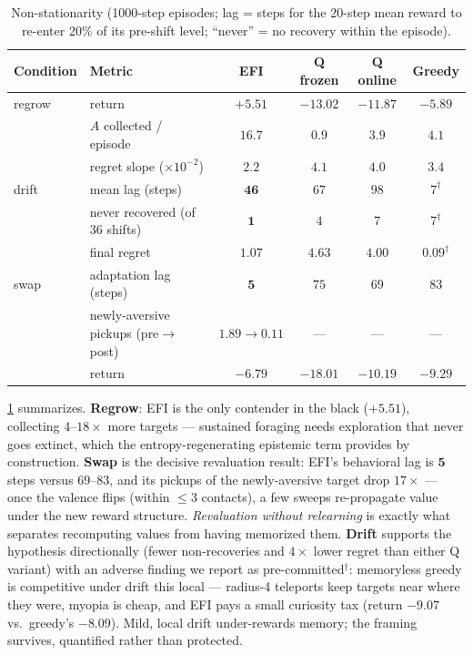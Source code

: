 \documentclass[11pt]{article}
\begin{document}
\begin{table}[t]
\centering
\caption{Non-stationarity (1000-step episodes; lag = steps for the 20-step mean reward to re-enter 20\% of its pre-shift level; ``never'' = no recovery within the episode).}
\label{tab:nonstat}
\small
\begin{tabular}{llcccc}
\toprule
Condition & Metric & \textbf{EFI} & Q frozen & Q online & Greedy \\
\midrule
regrow & return & $\mathbf{+5.51}$ & $-13.02$ & $-11.87$ & $-5.89$ \\
       & $A$ collected / episode & $\mathbf{16.7}$ & $0.9$ & $3.9$ & $4.1$ \\
       & regret slope ($\times10^{-2}$) & $\mathbf{2.2}$ & $4.1$ & $4.0$ & $3.4$ \\
\midrule
drift  & mean lag (steps) & $\mathbf{46}$ & $67$ & $98$ & $7^{\dagger}$ \\
       & never recovered (of 36 shifts) & $\mathbf{1}$ & $4$ & $7$ & $7^{\dagger}$ \\
       & final regret & $1.07$ & $4.63$ & $4.00$ & $\mathbf{0.09}^{\dagger}$ \\
\midrule
swap   & adaptation lag (steps) & $\mathbf{5}$ & $75$ & $69$ & $83$ \\
       & newly-aversive pickups (pre$\to$post) & $\mathbf{1.89\to0.11}$ & --- & --- & --- \\
       & return & $\mathbf{-6.79}$ & $-18.01$ & $-10.19$ & $-9.29$ \\
\bottomrule
\end{tabular}
\end{table}

\cref{tab:nonstat} summarizes. \textbf{Regrow}: EFI is the only contender in the black ($+5.51$), collecting $4$--$18\times$ more targets --- sustained foraging needs exploration that never goes extinct, which the entropy-regenerating epistemic term provides by construction. \textbf{Swap} is the decisive revaluation result: EFI's behavioral lag is $\mathbf{5}$ steps versus $69$--$83$, and its pickups of the newly-aversive target drop $17\times$ --- once the valence flips (within $\le3$ contacts), a few sweeps re-propagate value under the new reward structure. \emph{Revaluation without relearning} is exactly what separates recomputing values from having memorized them. \textbf{Drift} supports the hypothesis directionally (fewer non-recoveries and $4\times$ lower regret than either Q variant) with an adverse finding we report as pre-committed$^{\dagger}$: memoryless greedy is competitive under drift this local --- radius-4 teleports keep targets near where they were, myopia is cheap, and EFI pays a small curiosity tax (return $-9.07$ vs.\ greedy's $-8.09$). Mild, local drift under-rewards memory; the framing survives, quantified rather than protected.
\end{document}
